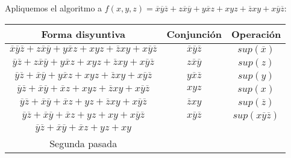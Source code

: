 \begin{ejemplo}
    Apliquemos el algoritmo a $f(x,y,z) =\overline{x}\overline{y}\overline{z}+z\overline{x}\overline{y}+y\overline{x}z+xyz+\overline{z}xy+x\overline{y}\overline{z}$:
    \begin{center}
        \begin{tabular}{ |c|c|c|  }
            \hline
            Forma disyuntiva                                                                                                             & Conjunción                             & Operación                        \\
            \hline
            $\overline{x}\overline{y}\overline{z}+z\overline{x}\overline{y}+y\overline{x}z+xyz+\overline{z}xy+x\overline{y}\overline{z}$ & $\overline{x}\overline{y}\overline{z}$ & $sup(\overline{x})$              \\
            $\overline{y}\overline{z}+z\overline{x}\overline{y}+y\overline{x}z+xyz+\overline{z}xy+x\overline{y}\overline{z}$             & $z\overline{x}\overline{y}$            & $sup(z)$                         \\
            $\overline{y}\overline{z}+\overline{x}\overline{y}+y\overline{x}z+xyz+\overline{z}xy+x\overline{y}\overline{z}$              & $y\overline{x}\overline{z}$            & $sup(y)$                         \\
            $\overline{y}\overline{z}+\overline{x}\overline{y}+\overline{x}z+xyz+\overline{z}xy+x\overline{y}\overline{z}$               & $xyz$                                  & $sup(x)$                         \\
            $\overline{y}\overline{z}+\overline{x}\overline{y}+\overline{x}z+yz+\overline{z}xy+x\overline{y}\overline{z}$                & $\overline{z}xy$                       & $sup(\overline{z})$              \\
            $\overline{y}\overline{z}+\overline{x}\overline{y}+\overline{x}z+yz+xy+x\overline{y}\overline{z}$                            & $x\overline{y}\overline{z}$            & $sup(x\overline{y}\overline{z})$ \\
            $\overline{y}\overline{z}+\overline{x}\overline{y}+\overline{x}z+yz+xy$                                                      &                                        &                                  \\
            Segunda pasada                                                                                                               &                                        &                                  \\

\end{tabular}
\end{center}
\end{ejemplo}
